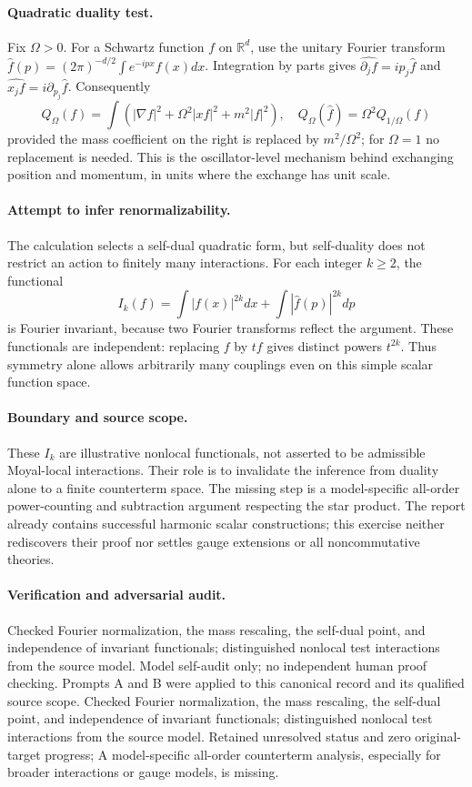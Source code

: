 \documentclass[11pt]{article}
\begin{document}
\paragraph{Quadratic duality test.} Fix $\Omega>0$. For a Schwartz function $f$ on $\mathbb R^d$, use the unitary Fourier transform $\widehat f(p)=(2\pi)^{-d/2}\int e^{-ipx}f(x)dx$. Integration by parts gives $\widehat{\partial_jf}=ip_j\widehat f$ and $\widehat{x_jf}=i\partial_{p_j}\widehat f$. Consequently
\[
 Q_\Omega(f)=\int(|\nabla f|^2+\Omega^2|x f|^2+m^2|f|^2),
 \quad Q_\Omega(\widehat f)=\Omega^2Q_{1/\Omega}(f)
\]
provided the mass coefficient on the right is replaced by $m^2/\Omega^2$; for $\Omega=1$ no replacement is needed. This is the oscillator-level mechanism behind exchanging position and momentum, in units where the exchange has unit scale.

\paragraph{Attempt to infer renormalizability.} The calculation selects a self-dual quadratic form, but self-duality does not restrict an action to finitely many interactions. For each integer $k\geq2$, the functional
\[
 I_k(f)=\int |f(x)|^{2k}dx+\int|\widehat f(p)|^{2k}dp
\]
is Fourier invariant, because two Fourier transforms reflect the argument. These functionals are independent: replacing $f$ by $tf$ gives distinct powers $t^{2k}$. Thus symmetry alone allows arbitrarily many couplings even on this simple scalar function space.

\paragraph{Boundary and source scope.} These $I_k$ are illustrative nonlocal functionals, not asserted to be admissible Moyal-local interactions. Their role is to invalidate the inference from duality alone to a finite counterterm space. The missing step is a model-specific all-order power-counting and subtraction argument respecting the star product. The report already contains successful harmonic scalar constructions; this exercise neither rediscovers their proof nor settles gauge extensions or all noncommutative theories.

\paragraph{Verification and adversarial audit.}
Checked Fourier normalization, the mass rescaling, the self-dual point, and independence of invariant functionals; distinguished nonlocal test interactions from the source model. Model self-audit only; no independent human proof checking. Prompts A and B were applied to this canonical record and its qualified source scope. Checked Fourier normalization, the mass rescaling, the self-dual point, and independence of invariant functionals; distinguished nonlocal test interactions from the source model. Retained unresolved status and zero original-target progress; A model-specific all-order counterterm analysis, especially for broader interactions or gauge models, is missing.
\end{document}
